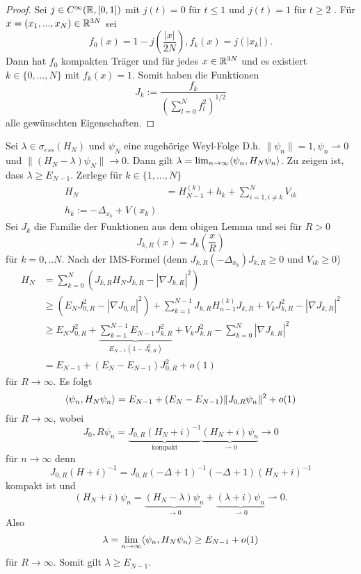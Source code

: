 \documentclass{mycourse}
\begin{document}
\begin{proof}
Sei $j\in C^\infty(\mathbb{R}, [0,1])$ mit $j(t)=0$ für $t\le 1$ und $j(t)=1$ für $t\ge 2$ . Für $x=(x_1,...,x_N) \in \mathbb{R}^{3N}$ sei
\[
f_0(x) = 1- j(\frac{|x|}{2N}), f_k(x) = j(|x_k|).
\]
Dann hat $f_0$ kompakten Träger und für jedes $x\in \mathbb{R}^{3N}$ und es existiert $k\in \{0,..., N\}$ mit $f_k(x) =1$. Somit haben die Funktionen
\[
J_k := \frac{f_k}{(\sum_{l=0}^N f^2_l)^{1/2}}
\]
alle gewünschten Eigenschaften. 
\end{proof}

\begin{seg}
Sei $\lambda \in \sigma_{ess} (H_N)$ und $\psi_{N}$ eine zugehörige Weyl-Folge D.h. $\| \psi_n \| = 1, \psi_n \rightharpoonup 0$ und $\| (H_N - \lambda) \psi_N\| \to 0$. Dann gilt $\lambda = \lim_{n \to \infty} \langle \psi_n, H_N \psi_n\rangle$. Zu zeigen ist, dass $\lambda \ge E_{N-1}$. Zerlege für $k\in \{1,...,N\}$
\begin{align*}
H_N &= H^{(k)}_{N-1} + h_k + \sum_{i=1, i \neq k}^N V_{ik}\\
h_k:= - \Delta_{x_k} + V(x_k)
\end{align*}
Sei $J_k$ die Familie der Funktionen aus dem obigen Lemma und sei für $R>0$
\[
J_{k,R}(x) = J_k(\frac{x}{R})
\]
für $k=0,..N$. Nach der IMS-Formel (denn $J_{k,R}(- \Delta_{x_k}) J_{k,R} \ge 0$ und $V_{ik} \ge 0$)
\begin{align*}
H_N &= \sum_{k=0}^N(J_{k,R} H_N J_{k,R} - | \nabla J_{k,R}|^2)\\
&\ge (E_N J_{0,R}^2 - | \nabla J_{0,R}|^2) + \sum_{k=1}^{N-1} J_{k,R} H_{n-1}^{(k)} J_{k,R} + V_k J_{k,R}^2 - | \nabla J_{k,R}|^2 \\
&\ge E_N J_{0,R}^2 + \underbrace{\sum_{k=1}^{N-1}  E_{N-1} J_{k,R}^2}_{E_{N-1} (1- J_{0,R}^2)} + V_k J_{k,R}^2 - \sum_{k=0}^N | \nabla J_{k,R}|^2 \\
&= E_{N-1} + (E_N - E_{N-1} ) J_{0,R}^2 + o(1)
\end{align*}
für $R\to \infty$.
Es folgt
\[
\langle \psi_n, H_N \psi_n\rangle = E_{N-1} + (E_N- E_{N-1}) \| J_{0,R} \psi_n\|^2 + o(1)
\]
für $R\to \infty$, wobei
\[
J_0,R \psi_n = \underbrace{J_{0,R} (H_N + i)^{-1}}_{\text{kompakt}} \underbrace{(H_N + i) \psi_n}_{\rightharpoonup 0} \to 0
\]
für $n\to \infty$ denn 
\[
J_{0,R}(H+i)^{-1} = J_{0,R}(-\Delta + 1)^{-1} (- \Delta + 1) (H_N +i)^{-1}
\]
kompakt ist und
\[
(H_{N}+i) \psi_n = \underbrace{(H_N - \lambda) \psi_n}_{\to 0} + \underbrace{(\lambda +i) \psi_n}_{\rightharpoonup 0} \rightharpoonup 0.
\]
Also 
\[
\lambda = \lim_{n\to \infty}\langle \psi_n, H_N \psi_n\rangle \ge E_{N-1} + o(1)
\]
für $R\to \infty$. Somit gilt $\lambda \ge E_{N-1}$.
\end{seg}
\end{document}
